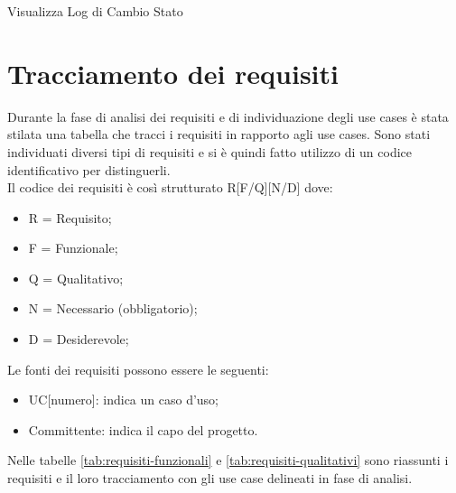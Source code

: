 \begin{usecase}{7.2}{Visualizza Log di Cambio Stato}
\label{uc:visualizzazione-log}
\end{usecase}

\newpage

\section{Tracciamento dei requisiti}

Durante la fase di analisi dei requisiti e di individuazione degli use cases è stata stilata una tabella che tracci i requisiti in rapporto agli use cases. Sono stati individuati diversi tipi di requisiti e si è quindi fatto utilizzo di un codice identificativo per distinguerli.\\
Il codice dei requisiti è così strutturato R[F/Q][N/D] dove:
\begin{itemize}
    \item[] R = Requisito;
    \item[] F = Funzionale;
    \item[] Q = Qualitativo;
    \item[] N = Necessario (obbligatorio);
    \item[] D = Desiderevole;
\end{itemize}

Le fonti dei requisiti possono essere le seguenti:
\begin{itemize}
    \item[] UC[numero]: indica un caso d'uso;
    \item[] Committente: indica il capo del progetto.
\end{itemize}

Nelle tabelle \ref{tab:requisiti-funzionali} e \ref{tab:requisiti-qualitativi} sono riassunti i requisiti e il loro tracciamento con gli use case delineati in fase di analisi.


